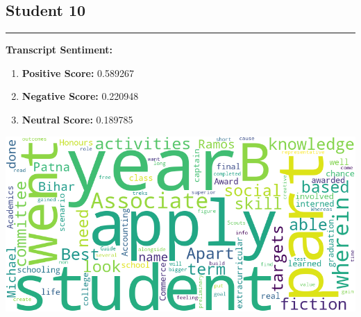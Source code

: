 \documentclass{article}
\begin{document}
\subsection{Student 10}
\begin{center}
    \color{green}\rule{1\linewidth}{0.7mm}
\end{center}
\large{\textbf{Transcript Sentiment:}}
\begin{tcolorbox}[ colback=purple!5!white,colframe=purple!75!black,   fonttitle=\bfseries, title=Sentiment Breakdown]
    \begin{enumerate}
        \item \textbf{Positive Score:} \textcolor{green!70!black}{0.589267}
        \item \textbf{Negative Score:} \textcolor{red!70!black}{0.220948}
        \item \textbf{Neutral Score:} \textcolor{blue!70!black}{0.189785}
    \end{enumerate}
    \end{tcolorbox}
    \vspace{0.3in}
    \begin{center}
        \includegraphics[width=1\columnwidth]{images/wordcloud_10.png}
    \end{center}
\end{document}
